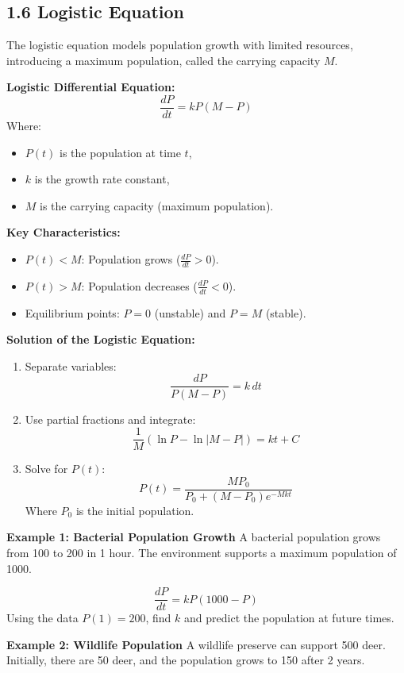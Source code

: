 \documentclass[10pt]{article}
\begin{document}
\subsection*{1.6 Logistic Equation}
The logistic equation models population growth with limited resources, introducing a maximum population, called the carrying capacity \( M \).

\textbf{Logistic Differential Equation:}
\[
\frac{dP}{dt} = k P (M - P)
\]
Where:
\begin{itemize}
    \item \( P(t) \) is the population at time \( t \),
    \item \( k \) is the growth rate constant,
    \item \( M \) is the carrying capacity (maximum population).
\end{itemize}

\textbf{Key Characteristics:}
\begin{itemize}
    \item \( P(t) < M \): Population grows (\( \frac{dP}{dt} > 0 \)).
    \item \( P(t) > M \): Population decreases (\( \frac{dP}{dt} < 0 \)).
    \item Equilibrium points: \( P = 0 \) (unstable) and \( P = M \) (stable).
\end{itemize}

\textbf{Solution of the Logistic Equation:}
\begin{enumerate}
    \item Separate variables:
    \[
    \frac{dP}{P(M - P)} = k \, dt
    \]
    \item Use partial fractions and integrate:
    \[
    \frac{1}{M} \left( \ln P - \ln |M - P| \right) = kt + C
    \]
    \item Solve for \( P(t) \):
    \[
    P(t) = \frac{M P_0}{P_0 + (M - P_0) e^{-Mkt}}
    \]
    Where \( P_0 \) is the initial population.
\end{enumerate}

\textbf{Example 1: Bacterial Population Growth}
A bacterial population grows from 100 to 200 in 1 hour. The environment supports a maximum population of 1000.

\[
\frac{dP}{dt} = k P (1000 - P)
\]
Using the data \( P(1) = 200 \), find \( k \) and predict the population at future times.

\textbf{Example 2: Wildlife Population}
A wildlife preserve can support 500 deer. Initially, there are 50 deer, and the population grows to 150 after 2 years.
\end{document}
